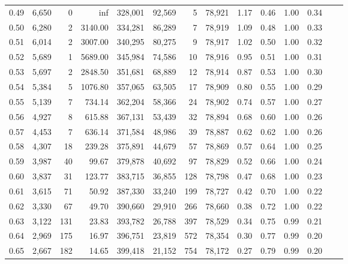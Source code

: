 \begin{tabular}{rrrrrrrrrrrrrr}
0.49 &  6,650 &      0 &      inf &  328,001 &   92,569 &       5 &  78,921 &  1.17 &  0.46 &  1.00 &      0.34 \\
0.50 &  6,280 &      2 &  3140.00 &  334,281 &   86,289 &       7 &  78,919 &  1.09 &  0.48 &  1.00 &      0.33 \\
0.51 &  6,014 &      2 &  3007.00 &  340,295 &   80,275 &       9 &  78,917 &  1.02 &  0.50 &  1.00 &      0.32 \\
0.52 &  5,689 &      1 &  5689.00 &  345,984 &   74,586 &      10 &  78,916 &  0.95 &  0.51 &  1.00 &      0.31 \\
0.53 &  5,697 &      2 &  2848.50 &  351,681 &   68,889 &      12 &  78,914 &  0.87 &  0.53 &  1.00 &      0.30 \\
0.54 &  5,384 &      5 &  1076.80 &  357,065 &   63,505 &      17 &  78,909 &  0.80 &  0.55 &  1.00 &      0.29 \\
0.55 &  5,139 &      7 &   734.14 &  362,204 &   58,366 &      24 &  78,902 &  0.74 &  0.57 &  1.00 &      0.27 \\
0.56 &  4,927 &      8 &   615.88 &  367,131 &   53,439 &      32 &  78,894 &  0.68 &  0.60 &  1.00 &      0.26 \\
0.57 &  4,453 &      7 &   636.14 &  371,584 &   48,986 &      39 &  78,887 &  0.62 &  0.62 &  1.00 &      0.26 \\
0.58 &  4,307 &     18 &   239.28 &  375,891 &   44,679 &      57 &  78,869 &  0.57 &  0.64 &  1.00 &      0.25 \\
0.59 &  3,987 &     40 &    99.67 &  379,878 &   40,692 &      97 &  78,829 &  0.52 &  0.66 &  1.00 &      0.24 \\
0.60 &  3,837 &     31 &   123.77 &  383,715 &   36,855 &     128 &  78,798 &  0.47 &  0.68 &  1.00 &      0.23 \\
0.61 &  3,615 &     71 &    50.92 &  387,330 &   33,240 &     199 &  78,727 &  0.42 &  0.70 &  1.00 &      0.22 \\
0.62 &  3,330 &     67 &    49.70 &  390,660 &   29,910 &     266 &  78,660 &  0.38 &  0.72 &  1.00 &      0.22 \\
0.63 &  3,122 &    131 &    23.83 &  393,782 &   26,788 &     397 &  78,529 &  0.34 &  0.75 &  0.99 &      0.21 \\
0.64 &  2,969 &    175 &    16.97 &  396,751 &   23,819 &     572 &  78,354 &  0.30 &  0.77 &  0.99 &      0.20 \\
0.65 &  2,667 &    182 &    14.65 &  399,418 &   21,152 &     754 &  78,172 &  0.27 &  0.79 &  0.99 &      0.20 \\

\end{tabular}

